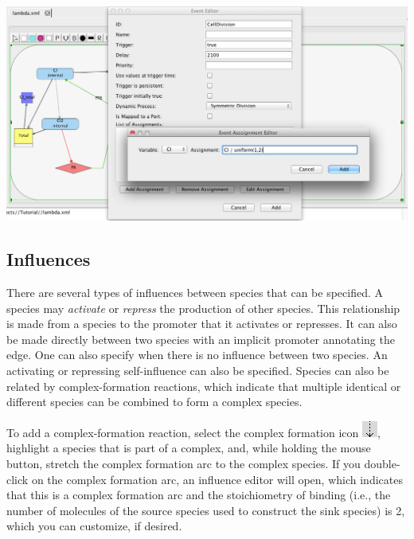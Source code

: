 \documentclass[titlepage,11pt]{article}
\begin{document}
\begin{center}
\includegraphics[width=160mm]{screenshots/event}
\end{center}

\clearpage

\subsection{\label{Influences}Influences}

There are several types of influences between species that can be specified.  A species may \emph{activate} or \emph{repress} the production of other species.  This relationship is made from a species to the promoter that it activates or represses.  It can also be made directly between two species with an implicit promoter annotating the edge.  One can also specify when there is no influence between two species.  An activating or repressing self-influence can also be specified.  Species can also be related by complex-formation reactions, which indicate that multiple identical or different species can be combined to form a complex species.  

To add a complex-formation reaction, select the complex formation icon \includegraphics{../gui/icons/modelview/bio_activation_selected}, highlight a species that is part of a complex, and, while holding the mouse button, stretch the complex formation arc to the complex species.  If you double-click on the complex formation arc, an influence editor will open, which indicates that this is a complex formation arc and the stoichiometry of binding (i.e., the number of molecules of the source species used to construct the sink species) is 2, which you can customize, if desired.
\end{document}
